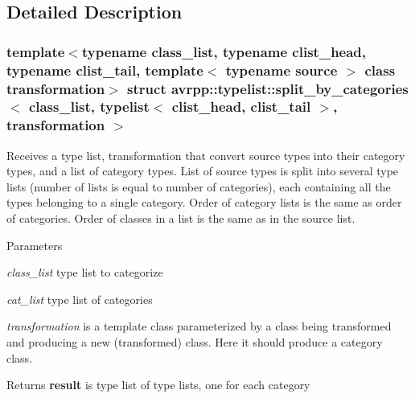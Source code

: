 \subsection{Detailed Description}
\subsubsection*{template$<$typename class\_\-list, typename clist\_\-head, typename clist\_\-tail, template$<$ typename source $>$ class transformation$>$ struct avrpp::typelist::split\_\-by\_\-categories$<$ class\_\-list, typelist$<$ clist\_\-head, clist\_\-tail $>$, transformation $>$}

Receives a type list, transformation that convert source types into their category types, and a list of category types. List of source types is split into several type lists (number of lists is equal to number of categories), each containing all the types belonging to a single category. Order of category lists is the same as order of categories. Order of classes in a list is the same as in the source list. 
\begin{DoxyParams}{Parameters}
\item[{\em class\_\-list}]type list to categorize \item[{\em cat\_\-list}]type list of categories \item[{\em transformation}]is a template class parameterized by a class being transformed and producing a new (transformed) class. Here it should produce a category class. \end{DoxyParams}
\begin{DoxyReturn}{Returns}
{\bfseries result} is type list of type lists, one for each category 
\end{DoxyReturn}



